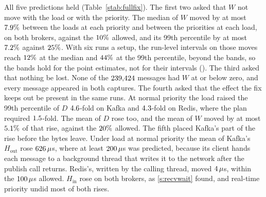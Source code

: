 \documentclass[10pt,journal,onecolumn]{IEEEtran}
\newcommand{\kafka}{Kafka}
\newcommand{\redis}{Redis}
\begin{document}
\begin{table}[tb]
\caption{\textbf{Timed between the kernel's timestamps, the latency held still while, at normal priority, the tail of $D$ rose
$\fullFixTailRatioLo$--$\fullFixTailRatioHi$-fold.} $W$ runs from the kernel's timestamp as a
message leaves the client machine to its timestamp as the message comes back. $D$ runs from the
publish call to the consumer's timestamp. One row for each broker, background load on the client
machine, and priority of the producer and the consumer together. Each figure is a setup's median
over its six runs of each run's statistic, in microseconds. $H_{\mathrm{out}}$ and
$H_{\mathrm{in}}$ are the client machine's time before and after $W$. The kernel's delay, from the
network card's own receive timestamp to the kernel's, is reported, not tested against a
prediction.}
\label{stab:fullfix}
\centering
\footnotesize

\end{table}

All five predictions held (Table~\ref{stab:fullfix}). The first two asked that $W$ not move
with the load or with the priority. The median of $W$ moved by at most $7.9\%$
between the loads at each priority and between the priorities at each load, on both brokers,
against the $10\%$ allowed, and its 99th percentile by at most
$7.2\%$ against $25\%$. With six runs a setup, the run-level
intervals on those moves reach $12\%$ at the median and
$44\%$ at the 99th percentile, beyond the bands, so the bands hold for the
point estimates, not for their intervals ().
The third asked that nothing be lost.
None of the $239{,}424$ messages had $W$ at or below zero, and every message appeared in
both captures. The fourth asked that the effect the fix keeps out be present in the same runs. At
normal priority the load raised the 99th percentile of $D$ $4.6$-fold on
\kafka{} and $4.3$-fold on \redis{}, where the plan required
$1.5$-fold. The mean of $D$ rose too, and the mean of $W$ moved by at most
$5.1\%$ of that rise, against the $20\%$ allowed. The fifth
placed \kafka{}'s part of the rise before the bytes leave. Under load at normal priority the mean
of \kafka{}'s $H_{\mathrm{out}}$ rose $626\,\mu$s, where at least
$200\,\mu$s was predicted, because its client hands each message to a
background thread that writes it to the network after the publish call returns. \redis{}'s,
written by the calling thread, moved $4\,\mu$s, within the
$100\,\mu$s allowed. $H_{\mathrm{in}}$ rose on both brokers, as
\ref{s:recvwait} found, and real-time priority undid most of both rises.
\end{document}
